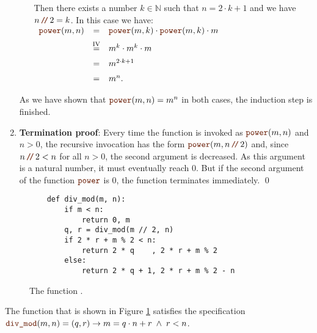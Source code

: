 \begin{enumerate}
\begin{enumerate}
            Then there exists a number $k \in \mathbb{N}$ such that $n = 2 \cdot k + 1$ and we have
            $n \dv 2 = k$.  In this case we have:
            \\[0.2cm]
            \hspace*{1.3cm}
            $ 
            \begin{array}{lcl}
            \mytt{power}(m,n) & = & \mytt{power}(m,k) \cdot \mytt{power}(m,k) \cdot m  \\[0.2cm]
                                & \stackrel{\mathrm{IV}}{=} & m^k \cdot m^k \cdot m  \\[0.2cm]
                                & = & m^{2\cdot k+1} \\[0.2cm]
                                & = & m^{n}.
            \end{array}
            $
      \end{enumerate}
      As we have shown that $\mytt{power}(m,n) = m^n$ in both cases, the induction step is finished. \mycheck
\item \textbf{Termination proof}:
      Every time the function  is invoked as $\mytt{power}(m, n)$ and $n > 0$, the recursive
      invocation has the form $\mytt{power}(m,n \dv 2)$ and, since $n \dv 2 < n$ for all $n > 0$, the second
      argument is decreased.  As this argument is a natural number, it must eventually reach $0$.  But if the
      second argument of the function $\mytt{power}$ is $0$, the function terminates immediately. \mycheck
      \qed
\end{enumerate}

\begin{figure}[!h]
  \centering
\begin{verbatim}
    def div_mod(m, n):
        if m < n:
            return 0, m
        q, r = div_mod(m // 2, n)
        if 2 * r + m % 2 < n:
            return 2 * q    , 2 * r + m % 2
        else:
            return 2 * q + 1, 2 * r + m % 2 - n                
\end{verbatim}
\vspace*{-0.3cm}
  \caption{The function .}
  \label{fig:div_mod}
\end{figure} 


\exampleEng
The function  that is shown in Figure \ref{fig:div_mod} satisfies the specification
\\[0.2cm]
\hspace*{1.3cm}
$\mytt{div\_mod}(m, n) = (q, r)  \rightarrow m = q \cdot n + r \;\wedge\; r < n$. \eox



